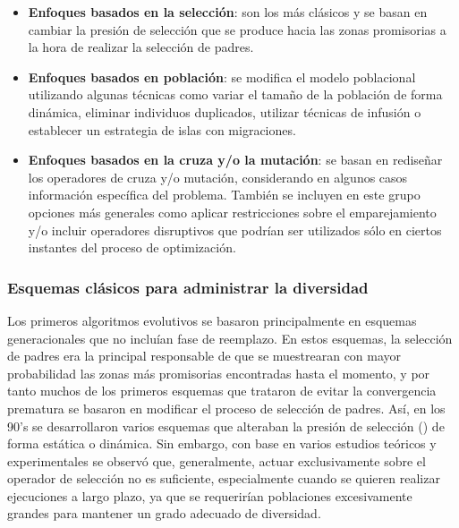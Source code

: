 \begin{itemize}
\item \textbf{Enfoques basados en la selección}: son los más clásicos y se basan en cambiar la presión de selección que se produce hacia las zonas promisorias a la hora de realizar
la selección de padres.
\item \textbf{Enfoques basados en población}: se modifica el modelo poblacional utilizando algunas técnicas como variar el tamaño de la población de forma dinámica, eliminar individuos duplicados, utilizar técnicas de infusión o establecer un estrategia de islas con migraciones.
\item \textbf{Enfoques basados en la cruza y/o la mutación}: se basan en rediseñar los operadores de cruza y/o mutación, considerando en algunos casos información específica del problema. También se incluyen en este grupo opciones más generales como aplicar restricciones sobre el emparejamiento y/o incluir operadores disruptivos que podrían ser utilizados sólo en ciertos instantes del proceso
de optimización.
\end{itemize}


\subsubsection{Esquemas clásicos para administrar la diversidad}

Los primeros algoritmos evolutivos se basaron principalmente en esquemas generacionales que no incluían fase de reemplazo.
%
En estos esquemas, la selección de padres era la principal responsable de que se muestrearan con mayor probabilidad las zonas más promisorias encontradas hasta el momento, y por tanto muchos de los primeros esquemas que trataron de evitar la convergencia prematura se basaron en modificar el proceso de selección de padres.
%
Así, en los 90's se desarrollaron varios esquemas que alteraban la presión de selección (\cite{eiben2003introduction}) de forma estática o dinámica.
%
Sin embargo, con base en varios estudios teóricos y experimentales se observó que, generalmente, actuar exclusivamente sobre el operador de selección no es suficiente, especialmente cuando se quieren realizar ejecuciones a largo plazo, ya que se requerirían poblaciones excesivamente grandes para mantener un grado adecuado de diversidad.

